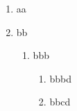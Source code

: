 \begin{enumerate}
  \item aa
  \item bb
  \begin{enumerate}
    \item bbb
    \begin{enumerate}
      \item bbbd
      \item bbcd
    \end{enumerate}
  \end{enumerate}
\end{enumerate}
